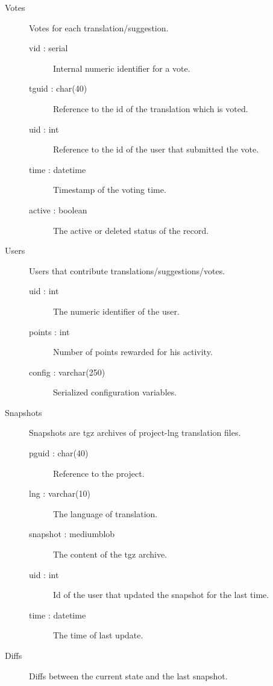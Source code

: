 \documentclass[11pt]{article}
\begin{document}
\begin{description}
\item [Votes] Votes for each translation/suggestion.

\begin{description}
\item [vid : serial] Internal numeric identifier for a vote.
\item [tguid : char(40)] Reference to the id of the translation
          which is voted.
\item [uid : int] Reference to the id of the user that submitted the
          vote.
\item [time : datetime] Timestamp of the voting time.
\item [active : boolean] The active or deleted status of the record.
\end{description}

\item [Users] Users that contribute translations/suggestions/votes.

\begin{description}
\item [uid : int] The numeric identifier of the user.
\item [points : int] Number of points rewarded for his activity.
\item [config : varchar(250)] Serialized configuration variables.
\end{description}

\item [Snapshots] Snapshots are tgz archives of project-lng
                  translation files.

\begin{description}
\item [pguid : char(40)] Reference to the project.
\item [lng : varchar(10)] The language of translation.
\item [snapshot : mediumblob] The content of the tgz archive.
\item [uid : int] Id of the user that updated the snapshot for the
                    last time.
\item [time : datetime] The time of last update.
\end{description}

\item [Diffs] Diffs between the current state and the last snapshot.


\end{description}
\end{document}

